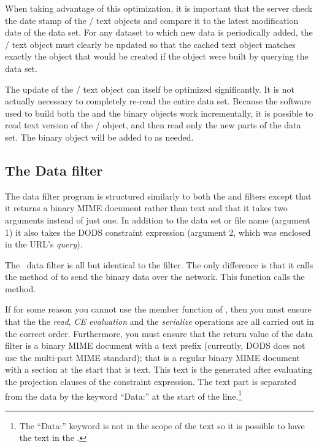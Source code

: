 When taking advantage of this optimization, it is important that the
server check the date stamp of the / text
objects and compare it to the latest modification date of the data
set. For any dataset to which new data is periodically added, the
/ text object must clearly be updated so that
the cached text object matches exactly the object that would be
created if the object were built by querying the data set.

The update of the / text object can itself be
optimized significantly.  It is not actually necessary to completely
re-read the entire data set.  Because the software used to build both
the  and the  binary objects work incrementally,
it is possible to read text version of the /
object, and then read only the new parts of the data set. The binary
object will be added to as needed.


\subsection{The Data filter}

The data filter program is structured similarly to both the
 and  filters except that it returns a binary
MIME document rather than text and that it takes two arguments instead
of just one. In addition to the data set or file name (argument 1) it
also takes the DODS constraint expression (argument 2, which was
enclosed in the URL's \emph{query}).

The \netcdf\ data filter is all but identical to the 
filter.  The only difference is that it calls the 
method of  to send the binary data over the network.
This function calls the   method.

If for some reason you cannot use the  member function of
, then you must ensure that the the \emph{read}, \emph{CE
  evaluation} and the \emph{serialize} operations are all carried out
in the correct order.  Furthermore, you must ensure that the return
value of the data filter is a binary MIME document with a text prefix
(currently, DODS does not use the multi-part MIME standard); that is a
regular binary MIME document with a section at the start that is text.
This text is the  generated after evaluating the projection
clauses of the constraint expression. The text part is separated from
the data by the keyword ``Data:'' at the start of the
line.\footnote{The ``Data:'' keyword is not in the scope of the text
   so it is possible to have the text  in the
  .}


